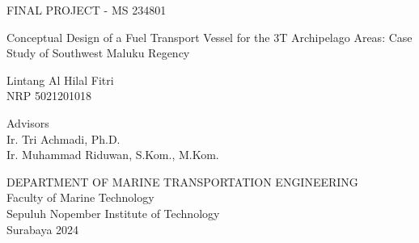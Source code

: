 FINAL PROJECT - MS 234801

\vspace{6ex}

\begin{large}
  Conceptual Design of a Fuel Transport Vessel for the 3T Archipelago Areas: Case Study of Southwest Maluku Regency
\end{large}

\vspace{4ex}

Lintang Al Hilal Fitri \\
NRP 5021201018

\vspace{2ex}

Advisors \\
Ir. Tri Achmadi, Ph.D.\\
Ir. Muhammad Riduwan, S.Kom., M.Kom. 

\vspace{6ex}

DEPARTMENT OF MARINE TRANSPORTATION ENGINEERING \\
Faculty of Marine Technology \\
Sepuluh Nopember Institute of Technology \\
Surabaya 2024
